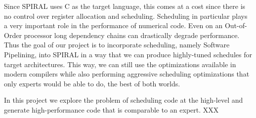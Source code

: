 \documentclass[12pt]{article}
\begin{document}
Since SPIRAL uses C as the target language, this comes at a cost since there is no control over register allocation and
scheduling. Scheduling in particular plays a very important role in the performance of numerical code. Even on an Out-of-Order
processor long dependency chains can drastically degrade performance. Thus the goal of our project is to incorporate scheduling,
namely Software Pipelining, into SPIRAL in a way that we can produce highly-tuned schedules for target architectures.
This way, we can still use the optimizations available in modern compilers while also performing aggressive scheduling optimizations
that only experts would be able to do, the best of both worlds.

In this project we explore the problem of scheduling code at the high-level and generate high-performance code that is comparable
to an expert. XXX

\begin{comment}
+( ) APGS aim to replace expert programmers for high-performance code.
+( ) For some classes of operations they have been very successful, but for
  others they fall short in performance.

+( ) Most expert programmers code their implementations in low-level assembly
  code and perform micro-architectural specific optimizations that production
  compilers cannot do for loss of generality.

+( ) This is further aggravated by the fact that experts test and tune various
  permutations of their code and its scheduling, a task that compilers do not
  do for the same reasoning as above.

+( ) Even on out-of-order machines scheduling at the code level is important
     to minimize the effects of long dependency chains that can cause the
     system to behave like an in-order processor.


+( ) APGS tune and optimize an implementation of an operations from the
  algorithmic level down to the low level just as an expert would, but because
  these systems rely on a high-level language like C as a target instead of
  assembly.

+( ) As a result these systems must rely on the compiler for instruction
  scheduling.

+( ) One could target assembly instead of a higher-level language but that
  defeats the purpose of having a portable system that can generate
  specialized code

+( ) How can we effectively schedule code at the high-level and generate
  high-performance code that is comparable to an expert.
\end{comment}
\end{document}
